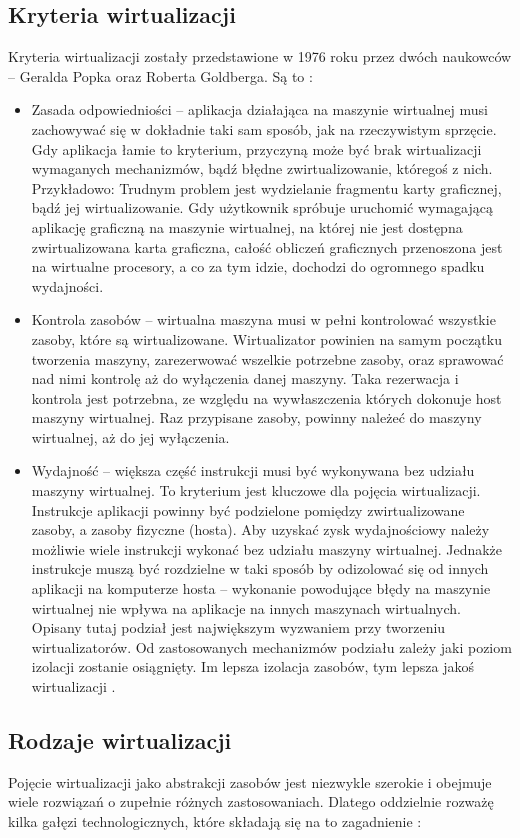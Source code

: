 \documentclass[10pt,a4paper,titlepage,twoside]{report}
\begin{document}
\subsection{Kryteria wirtualizacji}\indent \indent Kryteria wirtualizacji zostały przedstawione w 1976 roku przez dwóch naukowców – Geralda Popka oraz Roberta Goldberga. Są to \cite{ad15}:
\begin{itemize}
	\item Zasada odpowiedniości – aplikacja działająca na maszynie wirtualnej musi zachowywać się w dokładnie taki sam sposób, jak na rzeczywistym sprzęcie.
Gdy aplikacja łamie to kryterium, przyczyną może być brak wirtualizacji wymaganych mechanizmów, bądź błędne zwirtualizowanie, któregoś z nich. Przykładowo: Trudnym problem jest wydzielanie fragmentu karty graficznej, bądź jej wirtualizowanie. Gdy użytkownik spróbuje uruchomić wymagającą aplikację graficzną na maszynie wirtualnej, na której nie jest dostępna zwirtualizowana karta graficzna, całość obliczeń graficznych przenoszona jest na wirtualne procesory, a co za tym idzie, dochodzi do ogromnego spadku wydajności.
	\item Kontrola zasobów – wirtualna maszyna musi w pełni kontrolować wszystkie zasoby, które są wirtualizowane. Wirtualizator powinien na samym początku tworzenia maszyny, zarezerwować wszelkie potrzebne zasoby, oraz sprawować nad nimi kontrolę aż do wyłączenia danej maszyny. Taka rezerwacja i kontrola jest potrzebna, ze względu na wywłaszczenia których dokonuje host maszyny wirtualnej. Raz przypisane zasoby, powinny należeć do maszyny wirtualnej, aż do jej wyłączenia.
	\item Wydajność – większa część instrukcji musi być wykonywana bez udziału maszyny wirtualnej.
To kryterium jest kluczowe dla pojęcia wirtualizacji. Instrukcje aplikacji powinny być podzielone pomiędzy zwirtualizowane zasoby, a zasoby fizyczne (hosta). Aby uzyskać zysk wydajnościowy należy możliwie wiele instrukcji wykonać bez udziału maszyny wirtualnej. Jednakże instrukcje muszą być rozdzielne w taki sposób by odizolować się od innych aplikacji na komputerze hosta – wykonanie powodujące błędy na maszynie wirtualnej nie wpływa na aplikacje na innych maszynach wirtualnych. Opisany tutaj podział jest największym wyzwaniem przy tworzeniu wirtualizatorów. Od zastosowanych mechanizmów podziału zależy jaki poziom izolacji zostanie osiągnięty. Im lepsza izolacja zasobów, tym lepsza jakoś wirtualizacji \cite{ad17}.
\end{itemize}

\subsection{Rodzaje wirtualizacji}\indent \indent Pojęcie wirtualizacji jako abstrakcji zasobów jest niezwykle szerokie i obejmuje wiele rozwiązań o zupełnie różnych zastosowaniach. Dlatego oddzielnie rozważę kilka gałęzi technologicznych, które składają się na to zagadnienie \cite{ad15}\cite{ad18}:
\end{document}
